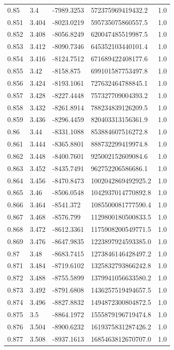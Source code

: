 \begin{tabular}{lllll}
0.85 & 3.4 & -7989.3253 & 572375969419432.2 & 1.0 \\
0.851 & 3.404 & -8023.0219 & 595735075860557.5 & 1.0 \\
0.852 & 3.408 & -8056.8249 & 620047485519987.5 & 1.0 \\
0.853 & 3.412 & -8090.7346 & 645352103440101.4 & 1.0 \\
0.854 & 3.416 & -8124.7512 & 671689422408177.6 & 1.0 \\
0.855 & 3.42 & -8158.875 & 699101587753497.8 & 1.0 \\
0.856 & 3.424 & -8193.1061 & 727632464788845.1 & 1.0 \\
0.857 & 3.428 & -8227.4448 & 757327709004393.2 & 1.0 \\
0.858 & 3.432 & -8261.8914 & 788234839126209.5 & 1.0 \\
0.859 & 3.436 & -8296.4459 & 820403313156361.9 & 1.0 \\
0.86 & 3.44 & -8331.1088 & 853884607516272.8 & 1.0 \\
0.861 & 3.444 & -8365.8801 & 888732299419974.8 & 1.0 \\
0.862 & 3.448 & -8400.7601 & 925002152609084.6 & 1.0 \\
0.863 & 3.452 & -8435.7491 & 962752206586686.1 & 1.0 \\
0.864 & 3.456 & -8470.8473 & 1002042869492925.2 & 1.0 \\
0.865 & 3.46 & -8506.0548 & 1042937014770892.8 & 1.0 \\
0.866 & 3.464 & -8541.372 & 1085500081777590.4 & 1.0 \\
0.867 & 3.468 & -8576.799 & 1129800180500833.5 & 1.0 \\
0.868 & 3.472 & -8612.3361 & 1175908200549771.5 & 1.0 \\
0.869 & 3.476 & -8647.9835 & 1223897924593385.0 & 1.0 \\
0.87 & 3.48 & -8683.7415 & 1273846146428497.2 & 1.0 \\
0.871 & 3.484 & -8719.6102 & 1325832793866242.8 & 1.0 \\
0.872 & 3.488 & -8755.5899 & 1379941056633580.2 & 1.0 \\
0.873 & 3.492 & -8791.6808 & 1436257519494657.5 & 1.0 \\
0.874 & 3.496 & -8827.8832 & 1494872300804872.5 & 1.0 \\
0.875 & 3.5 & -8864.1972 & 1555879196719474.8 & 1.0 \\
0.876 & 3.504 & -8900.6232 & 1619375831287426.2 & 1.0 \\
0.877 & 3.508 & -8937.1613 & 1685463812670707.0 & 1.0 \\

\end{tabular}

